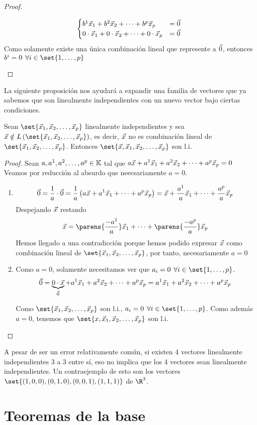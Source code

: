 \documentclass[../algebra_lineal.tex]{subfiles}
\begin{document}
\begin{proof}
\begin{enumerate}[itemindent=20pt]
        \[
        \begin{cases}
            {b}^{1}\vec{x}_{1}+{b}^{2}\vec{x}_{2}+\dots+{b}^{p}\vec{x}_{p} &= \vec{0} \\
            0 \cdot \vec{x}_1 + 0 \cdot \vec{x}_2 + \dots + 0 \cdot \vec{x}_p &= \vec{0}
        \end{cases}
        \]
        Como solamente existe una única combinación lineal que represente a $\vec{0}$, entonces $b^i = 0 \spc \forall i \in \set{1, \dots, p} $ 
    \end{enumerate}
\end{proof}

    La siguiente proposición nos ayudará a expandir una familia de vectores que ya sabemos que son linealmente independientes con un nuevo vector bajo ciertas condiciones.

    \begin{proposition}
        Sean $\set{\vlst{x}{p}}$ linealmente independientes y sea $\vx \notin \lspan{\set{\vlst{x}{p}}}$, es decir, $\vec{x}$ no es combinación lineal de $\set{\vlst{x}{p}}$. Entonces $\set{\vx, \vlst{x}{p}}$ son l.i.
    \end{proposition}

    \begin{proof}
        Sean $a,{a}^{1}, {a}^{2}, \dots, {a}^{p} \in \mathbb{K}$ tal que $a\vec{x} + {a}^{1}\vec{x}_{1}+{a}^{2}\vec{x}_{2}+\dots+{a}^{p}\vec{x}_{p} = 0$
        Veamos por reducción al absurdo que neecsariamente $a = 0$.
        \begin{enumerate}[itemindent=20pt]
            \item[\protect\fbox{si $a \ne 0$}] 
            \[
                \vec{0} = \frac{1}{a} \cdot \vec{0} = \frac{1}{a} \left( a\vec{x} + a^1 \vec{x}_1 + \dots + a^p\vec{x}_p  \right) = \vec{x} + \frac{a^1}{a}\vec{x}_1 + \dots + \frac{a^p}{a}\vec{x}_p
            \]
            Despejando $\vec{x}$ restando
            \[
                \vx = \parens{\frac{-a^1}{a}}\vx_1 + \dots + \parens{\frac{-a^p}{a}}\vx_p
            \]
            Hemos llegado a una contradicción porque hemos podido expresar $\vec{x}$ como combinación lineal de $\set{\vlst{x}{p}}$, por tanto, necesariamente $a=0$
            \item[\protect\fbox{si $a = 0$}] Como $a=0$, solamente necesitamos ver que $a_i=0 \spc \forall i \in \set{1, \dots, p}$.
            \[
                \vec{0} = \underbrace{0 \cdot \vec{x}}_{\vec{0}} + {a}^{1}\vec{x}_{1}+{a}^{2}\vec{x}_{2}+\dots+{a}^{p}\vec{x}_{p} = {a}^{1}\vec{x}_{1}+{a}^{2}\vec{x}_{2}+\dots+{a}^{p}\vec{x}_{p}
            \] 

            Como $\set{\vlst{x}{p}}$ son l.i., $a_i=0 \spc \forall i \in \set{1, \dots, p}$. Como además $a=0$, tenemos que $\set{x, \vlst{x}{p}}$ son l.i.
        \end{enumerate}
    \end{proof}

    \begin{remark}
        A pesar de ser un error relativamente común, si existen 4 vectores linealmente independientes 3 a 3 entre sí, eso no implica que los 4 vectores sean linealmente independientes. Un contraejemplo de esto son los vectores $\set{(1,0,0),(0,1,0),(0,0,1),(1,1,1)}$ de $\R^3$.
    \end{remark}

\section{Teoremas de la base}
\end{document}
